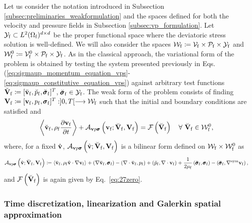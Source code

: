\documentclass[11pt,english]{article}
\def\densfluid{\rho_{\rm{f}}}                %
\def\viscfluid{\mu_{\rm{f}}}                 %
\def\domainfluid{\Omega_{\rm{f}}}
\def\vfluid{\vb{v}_{\rm{f}}}               %
\def\pfluid{p_{\mathrm{f}}}                %
\def\sigmafluid{\pmb{\sigma}_{\rm{f}}}
\def\vhat{\hat{\vb{v}}}
\def\unknofluid{\vb{V}_{\mathrm{f}}}
\def\vfluidspace{\mathcal{V}_{\rm{f}}}          %
\def\pfluidspace{\mathcal{P}_{\rm{f}}}          %
\def\sigmafluidspace{\mathcal{Y}_{\rm{f}}}      %
\def\unknofluidspace{\mathcal{W}_{\rm{f}}}      %
\def\testfluid{\breve{\vb{V}}_{\rm f}}
\def\testvfluid{\breve{\vb{v}}_{\rm f}}
\def\testpfluid{\breve{p}_{\rm f}}
\def\testsigmafluid{\breve{\pmb{\sigma}}_{\rm f}}
\def\testvfluidspace{\mathcal{V}_{\rm{f}}^0}    %
\def\testfluidspace{\mathcal{W}_{\rm{f}}^0}     %
\def\vpsigma{\vb{v}p\pmb{\sigma}}
\begin{document}
Let us consider the notation introduced in Subsection \ref{subsec:preliminaries_weakformulation} and the spaces defined for both the velocity and pressure fields in Subsection \ref{subsec:vp_formulation}. Let $\sigmafluidspace \subset L^2(\domainfluid)^{d\times d}$ be the proper functional space where the deviatoric stress solution is well-defined. We will also consider the spaces $\unknofluidspace \coloneqq \vfluidspace \times \pfluidspace \times \sigmafluidspace$ and $\testfluidspace \coloneqq \testvfluidspace \times \pfluidspace \times \sigmafluidspace$.
As in the classical approach, the variational form of the problem is obtained by testing the system presented previously in Eqs. (\ref{eq:sigmaup_momentum_equation_vps}-\ref{eq:sigmaup_constitutive_equation_vps}) against arbitrary test functions $\testfluid \coloneqq [\testvfluid,\testpfluid,\testsigmafluid]^T$, $\testsigmafluid \in \sigmafluidspace$. 
The weak form of the problem consists of finding $\unknofluid \coloneqq [\vfluid,\pfluid,\sigmafluid]^T :]0,T[\longrightarrow \unknofluidspace$ such that the initial and boundary conditions are satisfied and 
\begin{equation*}
    \left \langle  \testvfluid, \densfluid\frac{\partial \vfluid}{\partial t} \right \rangle + \mathcal{A}_{\vpsigma} \left ( \vfluid;  \testfluid, \unknofluid  \right) = \mathcal{F} \left ( \testfluid  \right) \quad \forall \ \testfluid \in \testfluidspace,
\end{equation*}
where, for a fixed $\vhat$,  $\mathcal{A}_{\vpsigma} \left ( \vhat; \testfluid,  \unknofluid  \right)$ is a bilinear form defined on $\unknofluidspace \times \testfluidspace$ as
\begin{alignat*}{1}
    \mathcal{A}_{\vpsigma} \left (\vhat;  \testfluid, \unknofluid \right) \coloneqq \left \langle  \testvfluid, \densfluid \vhat \cdot \nabla \vfluid  \right \rangle +  \left (\nabla \testvfluid ,\sigmafluid \right )  - \left( \nabla \cdot \testvfluid, \pfluid \right) + \left(  \testpfluid, \nabla \cdot \vfluid \right) +  \dfrac{1}{2\viscfluid}\left(\testsigmafluid, \sigmafluid \right)- \left(\testsigmafluid, \nabla^{\rm sym}\vfluid\right),   
\end{alignat*}
and $\mathcal{F} \left ( \testfluid  \right)$ is again given by Eq.~\eqref{eq:27zero}.

\subsubsection{Time discretization, linearization and Galerkin spatial approximation}
\end{document}
